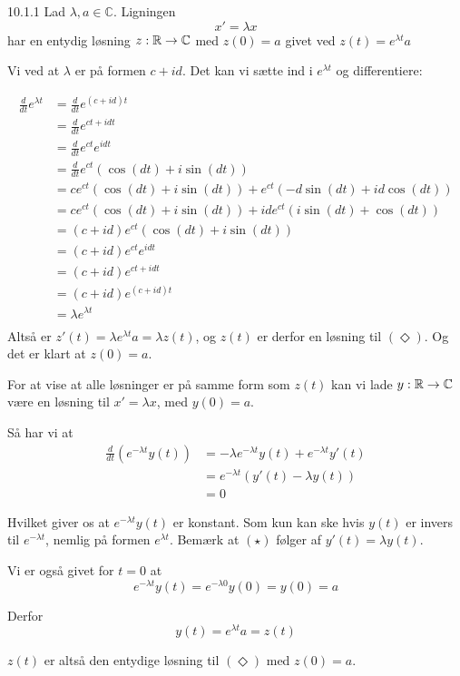\begin{lemma}{10.1.1}
	Lad $\lambda, a \in \mathbb{C}$. Ligningen
	\[
		x' = \lambda x\tag{$\Diamond$}
	\]
	har en entydig løsning $z:\mathbb{R}\rightarrow\mathbb{C}$
	med $z(0) = a$ givet ved $z(t) = e^{\lambda t}a$
\end{lemma}

\begin{bevis}
	\setlength{\parindent}{0cm}
	Vi ved at $\lambda$ er på formen $c + id$. Det kan vi sætte ind i
	$e^{\lambda t}$ og differentiere:

	\newcommand{\dif}{\frac{d}{dt}}
	\begin{align*}
		\dif e^{\lambda t} &= \dif e^{(c + id)t}\\
		&= \dif e^{ct + idt}\\
		&= \dif e^{ct}e^{idt}\\
		&= \dif e^{ct}(\cos(dt) + i\sin(dt))\\
		&= ce^{ct}(\cos(dt) + i\sin(dt)) + e^{ct}(-d\sin(dt) + id\cos(dt))\\
		&= ce^{ct}(\cos(dt) + i\sin(dt)) + ide^{ct}(i\sin(dt) + \cos(dt))\\
		&= (c + id)e^{ct}(\cos(dt) + i\sin(dt))\\
		&= (c + id)e^{ct}e^{idt}\\
		&= (c + id)e^{ct + idt}\\
		&= (c + id)e^{(c + id)t}\\
		&= \lambda e^{\lambda t}\\
	\end{align*}
	Altså er $z'(t) = \lambda e^{\lambda t}a = \lambda z(t)$, og $z(t)$ er
	derfor en løsning til $(\Diamond)$. Og det er klart at $z(0) =a$.

	For at vise at alle løsninger er på samme form som $z(t)$ kan vi lade
	$y:\mathbb{R} \rightarrow \mathbb{C}$ være en løsning til $x' = \lambda x$, med
	$y(0) = a$.

	Så har vi at
	\begin{align*}
		\dif(e^{-\lambda t}y(t)) &= -\lambda e^{-\lambda t}y(t) + e^{-\lambda t}y'(t)\\
		&= e^{-\lambda t}(y'(t) - \lambda y(t))\tag{$\star$}\\
		&= 0
	\end{align*}

	Hvilket giver os at $e^{-\lambda t}y(t)$ er konstant. Som kun kan ske hvis
	$y(t)$ er invers til $e^{-\lambda t}$, nemlig på formen $e^{\lambda t}$.
	Bemærk at $(\star)$ følger af $y'(t) = \lambda y(t)$. 
	
	Vi er også givet for $t = 0$ at
	\[
		e^{-\lambda t}y(t) = e^{-\lambda 0}y(0) = y(0) = a
	\]

	Derfor 
	\[
		y(t) = e^{\lambda t}a = z(t)
	\]

	$z(t)$ er altså den entydige løsning til $(\Diamond)$ med $z(0) = a$.
\end{bevis}
